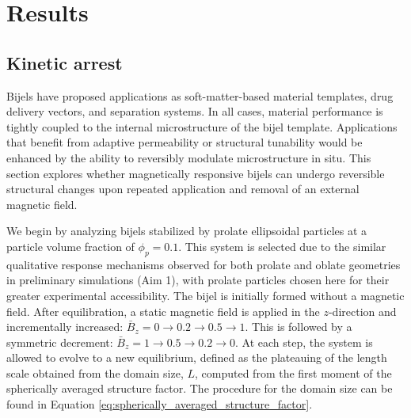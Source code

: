 \section{Results}

\subsection{Kinetic arrest}
\label{section:hysteresis_curve}

Bijels have proposed applications as soft-matter-based material templates, drug delivery vectors, and separation systems. In all cases, material performance is 
tightly coupled to the internal microstructure of the bijel template. Applications that benefit from adaptive permeability or structural tunability would be 
enhanced by the ability to reversibly modulate microstructure in situ. This section explores whether magnetically responsive bijels can undergo reversible 
structural changes upon repeated application and removal of an external magnetic field.

We begin by analyzing bijels stabilized by prolate ellipsoidal particles at a particle volume fraction of \(\phi_p = 0.1\). This system is selected due to the 
similar qualitative response mechanisms observed for both prolate and oblate geometries in preliminary simulations (Aim 1), with prolate particles chosen here 
for their greater experimental accessibility. The bijel is initially formed without a magnetic field. After equilibration, a static magnetic field is applied 
in the \(z\)-direction and incrementally increased: \(\bar{B}_z = 0 \rightarrow 0.2 \rightarrow 0.5 \rightarrow 1\). This is followed by a symmetric 
decrement: \(\bar{B}_z = 1 \rightarrow 0.5 \rightarrow 0.2 \rightarrow 0\). At each step, the system is allowed to evolve to a new equilibrium, defined as
the plateauing of the length scale obtained from the domain size, \(L\), computed from the first moment of the spherically averaged structure factor.
\cite{kendon_3d_1999,kendon_inertial_2001} The procedure for the domain size can be found in Equation \ref{eq:spherically_averaged_structure_factor}.

